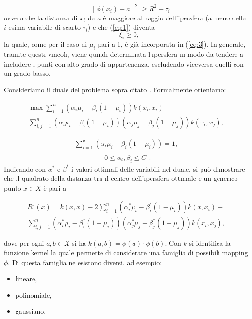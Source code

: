 \documentclass[12pt,italian]{report}
\begin{document}
\[ \quad \lVert \phi(x_{i}) - a \rVert ^2 \geq R^2 - \tau_{i} \]
ovvero che la distanza di $ x_{i} $ da $a$  è maggiore al raggio dell'ipersfera (a meno della $i$-esima variabile di scarto $\tau_{i}$) e che (\ref{eq:1}) diventa
\[\quad \xi_i \geq 0, \]
la quale, come per il caso di $\mu_i$ pari a 1, è già incorporata in (\ref{eq:3}). In generale, tramite questi vincoli, viene quindi determinata l'ipersfera in modo da tendere a includere i punti con alto grado di appartenenza, escludendo viceversa quelli con un grado basso.

Consideriamo il duale del problema sopra citato \cite{fletcher_optimization}. Formalmente otteniamo:



\begin{multline}
\max \sum_{i=1}^{n} (\alpha_{i} \mu_{i} - \beta_{i}(1-\mu_{i}))k(x_{i}, x_{i}) - \\ \sum_{i,j = 1}^{n}(\alpha_{i} \mu_{i} - \beta_{i}(1-\mu_{i}))(\alpha_{j} \mu_{j} - \beta_{j}(1-\mu_{j}))k(x_{i}, x_{j}), 
\end{multline}

\begin{equation}
\begin{aligned}
\sum_{i=1}^{n} (\alpha_{i} \mu_{i} - \beta_{i}(1-\mu_{i})) = 1, \\
\end{aligned}
\end{equation}
\begin{equation}
\begin{aligned}
0 \leq \alpha_{i}, \beta_{i} \leq C
\end{aligned}.
\end{equation}
Indicando con $ \alpha^* $ e $  \beta^* $ i valori ottimali delle variabili nel duale, si può dimostrare che il quadrato della distanza tra il centro dell'ipersfera ottimale e un generico punto $ x \in X $ è pari a

\begin{multline}
R^2(x) = k(x, x) - 2\sum_{i=1}^{n} (\alpha_{i}^* \mu_{i} - \beta_{i}^*(1-\mu_{i}))k(x, x_{i}) + \\ \sum_{i,j = 1}^{n}(\alpha_{i}^* \mu_{i} - \beta_{i}^*(1-\mu_{i}))(\alpha_{j}^* \mu_{j} - \beta_{j}^*(1-\mu_{j}))k(x_{i}, x_{j}),
\end{multline}

dove per ogni $ a, b \in X $ si ha $ k(a, b) = \phi(a) \cdot \phi(b) $. Con $k$ si identifica la funzione kernel la quale permette di considerare una famiglia di possibili mapping $\phi$. Di questa famiglia ne esistono diversi, ad esempio:
\begin{itemize}
	\item lineare,
	\item polinomiale,
	\item gaussiano.
\end{itemize}
\end{document}
